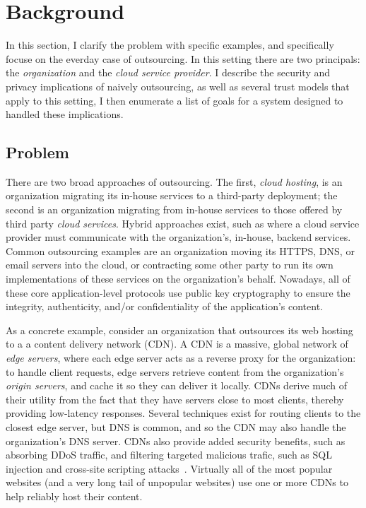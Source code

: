 \section{Background}
\label{sec:background}

In this section, I clarify the problem with specific examples, and specifically
focuse on the everday case of outsourcing.
%
%
In this setting there are two principals: the \emph{organization} and the
\emph{cloud service provider}.
%
I describe the security and privacy implications of naively outsourcing, as
well as several trust models that apply to this setting, 
%
I then enumerate a list of goals for a system designed to handled these
implications.


\subsection{Problem}

There are two broad approaches of outsourcing.
%
The first, \emph{cloud hosting}, is an organization migrating its in-house
services to a third-party deployment; the second is an organization  migrating
from in-house services to those offered by third party \emph{cloud services}.
%
Hybrid approaches exist, such as where a cloud service provider must
communicate with the organization's, in-house, backend services.
%
Common outsourcing examples are an organization moving its HTTPS, DNS, or
email servers into the cloud, or contracting some other party to run its own
implementations of these services on the organization's behalf.
%
Nowadays, all of these core application-level protocols use public key
cryptography to ensure the integrity, authenticity, and/or confidentiality of
the application's content.


As a concrete example, consider an organization that outsources its web hosting
to a a content delivery network (CDN)\@.
%
A CDN is a massive, global network of \emph{edge servers}, where each edge
server acts as a reverse proxy for the organization: to
handle client requests, edge servers retrieve content from the organization's
\emph{origin servers}, and cache it so they can deliver it locally.
%
CDNs derive much of their utility from the fact that they have servers close to
most clients, thereby providing low-latency responses.
%
Several techniques exist for routing clients to the closest edge server, but
DNS is common, and so the CDN may also handle the organization's DNS server.
%
CDNs also provide added security benefits, such as absorbing DDoS
traffic, and filtering targeted malicious trafic, such as SQL injection and
cross-site scripting attacks~\cite{securing-cdns}.
%
Virtually all of the most popular websites (and a very long tail of unpopular
websites) use one or more CDNs to help reliably host their content.


